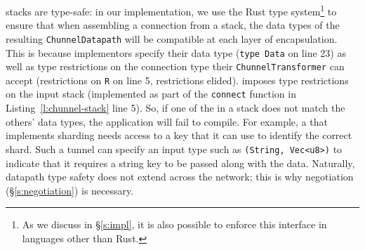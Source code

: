 \tunnel stacks are type-safe: in our implementation, we use the Rust type system\footnote{As we discuss in \S\ref{s:impl}, it is also possible to enforce this interface in languages other than Rust.} to ensure that when assembling a connection from a \tunnel stack, the data types of the resulting \texttt{ChunnelDatapath} will be compatible at each layer of encapsulation.
This is because \tunnel implementors specify their data type (\texttt{type Data} on line 23) as well as type restrictions on the connection type their \texttt{ChunnelTransformer} can accept (restrictions on \texttt{R} on line 5, restrictions elided).
\name imposes type restrictions on the input \tunnel stack (implemented as part of the \texttt{connect} function in Listing~\ref{l:chunnel-stack} line 5). So, if one of the \tunnels in a \tunnel stack does not match the others' data types, the application will fail to compile.
For example, a \tunnel that implements sharding needs access to a key that it can use to identify the correct shard. Such a tunnel can specify an input type such as \texttt{(String, Vec<u8>)} to indicate that it requires a string key to be passed along with the data. 
Naturally, datapath type safety does not extend across the network; this is why negotiation (\S\ref{s:negotiation}) is necessary.
